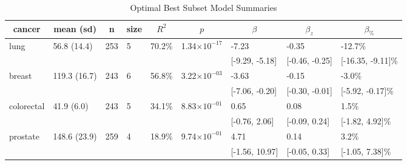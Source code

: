 %
\begin{table}[!tbp]
\caption{Optimal Best Subset Model Summaries\label{tab:best-subset}} 
\begin{center}
\begin{tabular}{lllllllll}
\hline\hline
\multicolumn{1}{c}{cancer}&\multicolumn{1}{c}{mean (sd)}&\multicolumn{1}{c}{n}&\multicolumn{1}{c}{size}&\multicolumn{1}{c}{$R^2$}&\multicolumn{1}{c}{$p$}&\multicolumn{1}{c}{$\beta$}&\multicolumn{1}{c}{$\beta_z$}&\multicolumn{1}{c}{$\beta_{\%}$}\tabularnewline
\hline
lung&56.8 (14.4)&253&5&70.2\%&1.34$\times10^{-17}$&-7.23&-0.35&-12.7\%\tabularnewline
&&&&&&[-9.29, -5.18]&[-0.46, -0.25]&[-16.35, -9.11]\%\tabularnewline
breast&119.3 (16.7)&243&6&56.8\%&3.22$\times10^{-03}$&-3.63&-0.15&-3.0\%\tabularnewline
&&&&&&[-7.06, -0.20]&[-0.30, -0.01]&[-5.92, -0.17]\%\tabularnewline
colorectal&41.9 (6.0)&243&5&34.1\%&8.83$\times10^{-01}$&0.65&0.08&1.5\%\tabularnewline
&&&&&&[-0.76, 2.06]&[-0.09, 0.24]&[-1.82, 4.92]\%\tabularnewline
prostate&148.6 (23.9)&259&4&18.9\%&9.74$\times10^{-01}$&4.71&0.14&3.2\%\tabularnewline
&&&&&&[-1.56, 10.97]&[-0.05, 0.33]&[-1.05, 7.38]\%\tabularnewline
\hline
\end{tabular}
\end{center}
\end{table}

